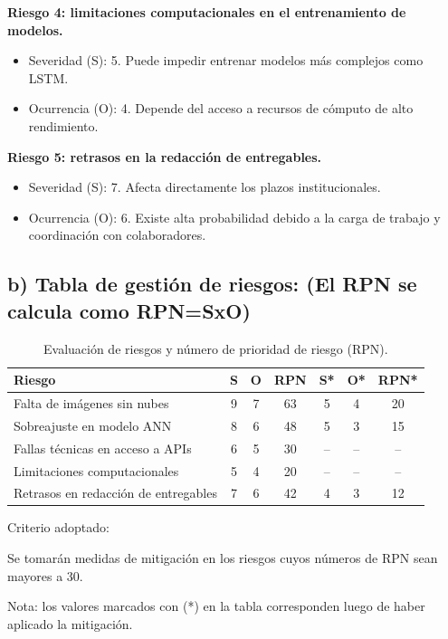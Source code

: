 \documentclass[
11pt, %
]{charter}
\begin{document}
\textbf{Riesgo 4: limitaciones computacionales en el entrenamiento de modelos.}
\begin{itemize}
    \item Severidad (S): 5. Puede impedir entrenar modelos más complejos como LSTM.
    \item Ocurrencia (O): 4. Depende del acceso a recursos de cómputo de alto rendimiento.
\end{itemize}

\textbf{Riesgo 5: retrasos en la redacción de entregables.}
\begin{itemize}
    \item Severidad (S): 7. Afecta directamente los plazos institucionales.
    \item Ocurrencia (O): 6. Existe alta probabilidad debido a la carga de trabajo y coordinación con colaboradores.
\end{itemize}

\subsection*{b) Tabla de gestión de riesgos: (El RPN se calcula como RPN=SxO)}

\begin{table}[htpb]
\caption{Evaluación de riesgos y número de prioridad de riesgo (RPN).}
\label{tab:riesgos}
\centering
\begin{tabularx}{\linewidth}{@{}|X|c|c|c|c|c|c|@{}}
\hline
\rowcolor[HTML]{C0C0C0} 
\textbf{Riesgo} & \textbf{S} & \textbf{O} & \textbf{RPN} & \textbf{S*} & \textbf{O*} & \textbf{RPN*} \\ \hline
Falta de imágenes sin nubes           & 9 & 7 & 63 & 5 & 4 & 20 \\ \hline
Sobreajuste en modelo ANN             & 8 & 6 & 48 & 5 & 3 & 15 \\ \hline
Fallas técnicas en acceso a APIs      & 6 & 5 & 30 & – & – & –  \\ \hline
Limitaciones computacionales          & 5 & 4 & 20 & – & – & –  \\ \hline
Retrasos en redacción de entregables  & 7 & 6 & 42 & 4 & 3 & 12 \\ \hline
\end{tabularx}
\end{table}


Criterio adoptado: 

Se tomarán medidas de mitigación en los riesgos cuyos números de RPN sean mayores a 30. 

Nota: los valores marcados con (*) en la tabla corresponden luego de haber aplicado la mitigación.
\end{document}
